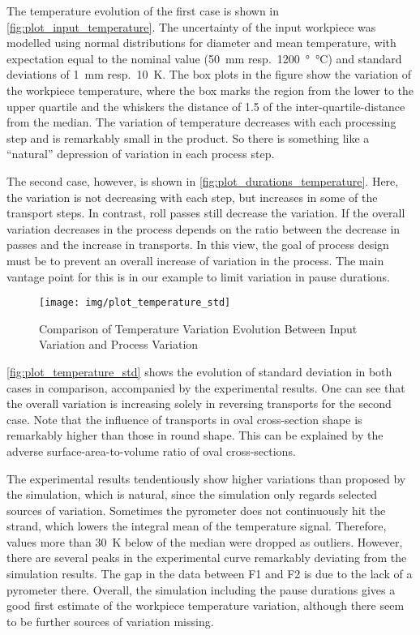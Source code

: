 The temperature evolution of the first case is shown in \autoref{fig:plot_input_temperature}.
The uncertainty of the input workpiece was modelled using normal distributions for diameter and mean temperature, with expectation equal to the nominal value (\qty{50}{\milli\meter} resp.~\qty{1200}{\degree\celsius}) and standard deviations of \qty{1}{\milli\meter} resp.~\qty{10}{\kelvin}.
The box plots in the figure show the variation of the workpiece temperature, where the box marks the region from the lower to the upper quartile and the whiskers the distance of \num{1.5} of the inter-quartile-distance from the median.
The variation of temperature decreases with each processing step and is remarkably small in the product.
So there is something like a ``natural'' depression of variation in each process step.

The second case, however, is shown in \autoref{fig:plot_durations_temperature}.
Here, the variation is not decreasing with each step, but increases in some of the transport steps.
In contrast, roll passes still decrease the variation.
If the overall variation decreases in the process depends on the ratio between the decrease in passes and the increase in transports.
In this view, the goal of process design must be to prevent an overall increase of variation in the process.
The main vantage point for this is in our example to limit variation in pause durations.

\begin{figure}
    \centering
    \texttt{[image: img/plot\_temperature\_std]}
    \caption{Comparison of Temperature Variation Evolution Between Input Variation and Process Variation}
    \label{fig:plot_temperature_std}
\end{figure}

\autoref{fig:plot_temperature_std} shows the evolution of standard deviation in both cases in comparison, accompanied by the experimental results.
One can see that the overall variation is increasing solely in reversing transports for the second case.
Note that the influence of transports in oval cross-section shape is remarkably higher than those in round shape.
This can be explained by the adverse surface-area-to-volume ratio of oval cross-sections.

The experimental results tendentiously show higher variations than proposed by the simulation, which is natural, since the simulation only regards selected sources of variation.
Sometimes the pyrometer does not continuously hit the strand, which lowers the integral mean of the temperature signal.
Therefore, values more than \qty{30}{\kelvin} below of the median were dropped as outliers.
However, there are several peaks in the experimental curve remarkably deviating from the simulation results.
The gap in the data between F1 and F2 is due to the lack of a pyrometer there.
Overall, the simulation including the pause durations gives a good first estimate of the workpiece temperature variation, although there seem to be further sources of variation missing.

